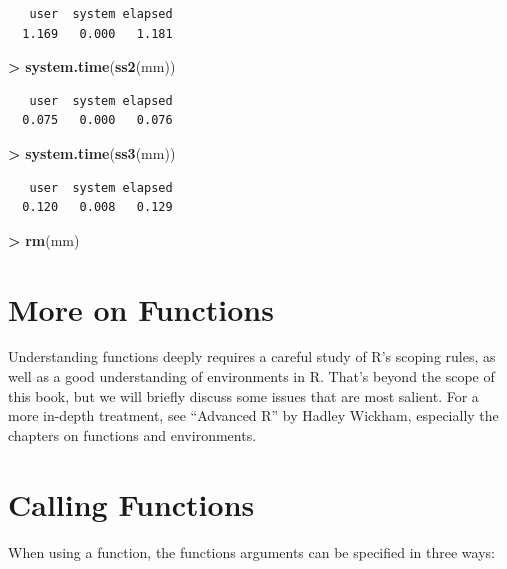 \documentclass[]{krantz}
\makeatletter
\newenvironment{Shaded}{\begin{snugshade}}{\end{snugshade}}
\newcommand{\KeywordTok}[1]{\textcolor[rgb]{0.27,0.27,0.27}{\textbf{#1}}}
\newcommand{\StringTok}[1]{\textcolor[rgb]{0.5,0.5,0.5}{#1}}
\newcommand{\OperatorTok}[1]{\textcolor[rgb]{0.43,0.43,0.43}{\textbf{#1}}}
\newcommand{\NormalTok}[1]{#1}
\newenvironment{kframe}{%
\medskip{}
\setlength{\fboxsep}{.8em}
 \def\at@end@of@kframe{}%
 \ifinner\ifhmode%
  \def\at@end@of@kframe{\end{minipage}}%
  \begin{minipage}{\columnwidth}%
 \fi\fi%
 \def\FrameCommand##1{\hskip\@totalleftmargin \hskip-\fboxsep
 \colorbox{shadecolor}{##1}\hskip-\fboxsep
     \hskip-\linewidth \hskip-\@totalleftmargin \hskip\columnwidth}%
 \MakeFramed {\advance\hsize-\width
   \@totalleftmargin\z@ \linewidth\hsize
   \@setminipage}}%
 {\par\unskip\endMakeFramed%
 \at@end@of@kframe}
\renewenvironment{Shaded}{\begin{kframe}}{\end{kframe}}
\makeatother
\begin{document}
\begin{verbatim}
   user  system elapsed 
  1.169   0.000   1.181 
\end{verbatim}

\begin{Shaded}
\begin{Highlighting}[]
\OperatorTok{>}\StringTok{ }\KeywordTok{system.time}\NormalTok{(}\KeywordTok{ss2}\NormalTok{(mm))}
\end{Highlighting}
\end{Shaded}

\begin{verbatim}
   user  system elapsed 
  0.075   0.000   0.076 
\end{verbatim}

\begin{Shaded}
\begin{Highlighting}[]
\OperatorTok{>}\StringTok{ }\KeywordTok{system.time}\NormalTok{(}\KeywordTok{ss3}\NormalTok{(mm))}
\end{Highlighting}
\end{Shaded}

\begin{verbatim}
   user  system elapsed 
  0.120   0.008   0.129 
\end{verbatim}

\begin{Shaded}
\begin{Highlighting}[]
\OperatorTok{>}\StringTok{ }\KeywordTok{rm}\NormalTok{(mm)}
\end{Highlighting}
\end{Shaded}

\section{More on Functions}\label{more-on-functions}

Understanding functions deeply requires a careful study of R's scoping
rules, as well as a good understanding of environments in R. That's
beyond the scope of this book, but we will briefly discuss some issues
that are most salient. For a more in-depth treatment, see ``Advanced R''
by Hadley Wickham, especially the chapters on functions and
environments.

\section{Calling Functions}\label{calling-functions}

When using a function, the functions arguments can be specified in three
ways:
\end{document}
